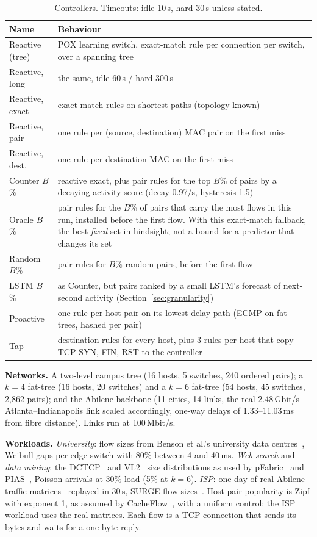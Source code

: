 \documentclass[conference]{IEEEtran}
\begin{document}
\begin{table}[t]
\caption{Controllers. Timeouts: idle 10\,s, hard 30\,s unless stated.}\label{tab:controllers}
\centering\footnotesize
\begin{tabular}{@{}p{2.3cm}p{5.6cm}@{}}
\toprule
Name & Behaviour \\
\midrule
Reactive (tree) & POX learning switch, exact-match rule per connection per switch, over a spanning tree \\
Reactive, long & the same, idle 60\,s / hard 300\,s \\
Reactive, exact & exact-match rules on shortest paths (topology known) \\
Reactive, pair & one rule per (source, destination) MAC pair on the first miss \\
Reactive, dest. & one rule per destination MAC on the first miss \\
Counter $B$\% & reactive exact, plus pair rules for the top $B$\% of pairs by a decaying activity score (decay 0.97/s, hysteresis 1.5) \\
Oracle $B$\% & pair rules for the $B$\% of pairs that carry the most flows in this run, installed before the first flow. With this exact-match fallback, the best \emph{fixed} set in hindsight; not a bound for a predictor that changes its set \\
Random $B$\% & pair rules for $B$\% random pairs, before the first flow \\
LSTM $B$\% & as Counter, but pairs ranked by a small LSTM's forecast of next-second activity (Section~\ref{sec:granularity}) \\
Proactive & one rule per host pair on its lowest-delay path (ECMP on fat-trees, hashed per pair) \\
Tap & destination rules for every host, plus 3 rules per host that copy TCP SYN, FIN, RST to the controller \\
\bottomrule
\end{tabular}
\end{table}

\textbf{Networks.} A two-level campus tree (16 hosts, 5 switches, 240 ordered pairs); a $k{=}4$ fat-tree (16 hosts, 20 switches) and a $k{=}6$ fat-tree (54 hosts, 45 switches, 2,862 pairs); and the Abilene backbone (11 cities, 14 links, the real 2.48\,Gbit/s Atlanta--Indianapolis link scaled accordingly, one-way delays of 1.33--11.03\,ms from fibre distance). Links run at 100\,Mbit/s.

\textbf{Workloads.} \emph{University}: flow sizes from Benson et al.'s university data centres~\cite{benson}, Weibull gaps per edge switch with 80\% between 4 and 40\,ms. \emph{Web search} and \emph{data mining}: the DCTCP~\cite{dctcp} and VL2~\cite{vl2} size distributions as used by pFabric~\cite{pfabric} and PIAS~\cite{pias}, Poisson arrivals at 30\% load (5\% at $k{=}6$). \emph{ISP}: one day of real Abilene traffic matrices~\cite{zhang2005} replayed in 30\,s, SURGE flow sizes~\cite{surge}. Host-pair popularity is Zipf with exponent 1, as assumed by CacheFlow~\cite{cacheflow}, with a uniform control; the ISP workload uses the real matrices. Each flow is a TCP connection that sends its bytes and waits for a one-byte reply.
\end{document}
